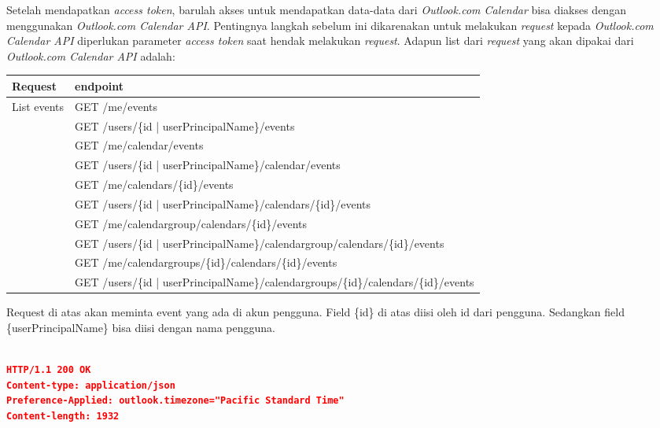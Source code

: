 \begin{description}
Setelah mendapatkan \textit{access token}, barulah akses untuk mendapatkan data-data dari \textit{Outlook.com Calendar} bisa diakses dengan menggunakan \textit{Outlook.com Calendar API}. Pentingnya langkah sebelum ini dikarenakan untuk melakukan \textit{request} kepada \textit{Outlook.com Calendar API} diperlukan parameter \textit{access token} saat hendak melakukan \textit{request}. Adapun list dari \textit{request} yang akan dipakai dari \textit{Outlook.com Calendar API} adalah:

\begin{center}
	\begin{tabular}{|p{5cm}|p{10cm}|}
	\hline
		Request & endpoint\\ \hline 
		List events & GET /me/events\\
		 & GET /users/\{id | userPrincipalName\}/events \\
		 & GET /me/calendar/events\\
		 & GET /users/\{id | userPrincipalName\}/calendar/events\\
		 & GET /me/calendars/\{id\}/events\\
		 & GET /users/\{id | userPrincipalName\}/calendars/\{id\}/events\\
		 & GET /me/calendargroup/calendars/\{id\}/events\\
		 & GET /users/\{id | userPrincipalName\}/calendargroup/calendars/\{id\}/events\\
		 & GET /me/calendargroups/\{id\}/calendars/\{id\}/events\\
		 & GET /users/\{id | userPrincipalName\}/calendargroups/\{id\}/calendars/\{id\}/events\\
	\hline
	\end{tabular}
\end{center} 

Request di atas akan meminta event yang ada di akun pengguna. Field \{id\} di atas diisi oleh id dari pengguna. Sedangkan field \{userPrincipalName\} bisa diisi dengan nama pengguna. 

\begin{lstlisting}[caption={Contoh respon dari request List events diatas},label={lst:atribute-view},language=json]

HTTP/1.1 200 OK
Content-type: application/json
Preference-Applied: outlook.timezone="Pacific Standard Time"
Content-length: 1932


\end{lstlisting}
\end{description}
